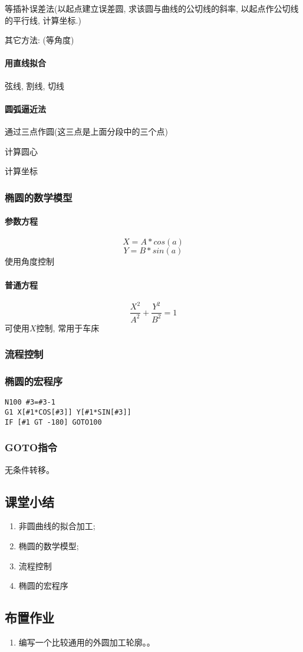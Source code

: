  等插补误差法(以起点建立误差圆, 求该圆与曲线的公切线的斜率, 以起点作公切线的平行线, 计算坐标.)
 
 其它方法: (等角度)
 
\paragraph{用直线拟合}
 弦线, 割线, 切线
 \paragraph{圆弧逼近法}
 通过三点作圆(这三点是上面分段中的三个点)
 
 计算圆心
 
 计算坐标
 
\subsubsection{椭圆的数学模型}
\paragraph {参数方程}
 $$X=A*cos(a)$$
 $$Y=B*sin(a)$$
  使用角度控制
\paragraph{ 普通方程}
 $$ \frac{X^2}{A^2} + \frac{Y^2}{B^2} =1 $$
  可使用$X$控制, 常用于车床
\subsubsection{流程控制}
\subsubsection{椭圆的宏程序}
\begin{verbatim}
N100 #3=#3-1
G1 X[#1*COS[#3]] Y[#1*SIN[#3]]
IF [#1 GT -180] GOTO100
\end{verbatim}
\subsubsection{GOTO指令}
无条件转移。
 
\subsection{课堂小结}

\begin{enumerate}[1、]
	\item 非圆曲线的拟合加工;
	\item 椭圆的数学模型;
	\item 流程控制
	\item 椭圆的宏程序
\end{enumerate}

\vfill
\subsection{布置作业}
\begin{enumerate}[1、]
	\item 编写一个比较通用的外圆加工轮廓。。 
\end{enumerate}
\vfill